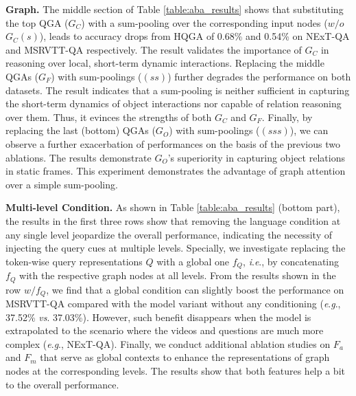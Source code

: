 \documentclass[letterpaper]{article} \usepackage{aaai21}  \usepackage{times}  \usepackage{helvet} \usepackage{courier}  \usepackage[hyphens]{url}  \usepackage{graphicx} \urlstyle{rm} \def\UrlFont{\rm}  \usepackage{natbib}  \usepackage{caption} \usepackage{color, colortbl}
\newcommand{\vs}{\textit{vs}. }
\newcommand{\ie}{\textit{i}.\textit{e}.}
\newcommand{\eg}{\textit{e}.\textit{g}.}
\begin{document}
\textbf{Graph.} The middle section of Table \ref{table:aba_results} shows that substituting the top QGA ($G_C$) with a sum-pooling over the corresponding input nodes ($w/o$ $G_C(s)$), leads to accuracy drops from HQGA of 0.68\% and 0.54\% on NExT-QA and MSRVTT-QA respectively. The result validates the importance of $G_C$ in reasoning over local, short-term dynamic interactions. Replacing the middle QGAs ($G_F$) with sum-poolings ($(ss)$) further degrades the performance on both datasets. 
The result indicates that a sum-pooling is neither sufficient in capturing the short-term dynamics of object interactions nor capable of relation reasoning over them. Thus, it evinces the strengths of both $G_C$ and $G_F$. Finally, by replacing the last (bottom) QGAs ($G_O$) with sum-poolings ($(sss)$), we can observe a further exacerbation of performances on the basis of the previous two ablations. The results demonstrate $G_O$'s superiority in capturing object relations in static frames. This experiment demonstrates the advantage of graph attention over a simple sum-pooling.

\textbf{Multi-level Condition.} 
As shown in Table \ref{table:aba_results} (bottom part), the results in the first three rows show that removing the language condition at any single level jeopardize the overall performance, indicating the necessity of injecting the query cues at multiple levels. Specially, we investigate replacing the token-wise query representations $Q$ with a global one $f_Q$, \ie, by concatenating $f_Q$ with the respective graph nodes at all levels. From the results shown in the row $w/f_Q$, we find that a global condition can slightly boost the performance on MSRVTT-QA compared with the model variant without any conditioning (\eg, 37.52\% \vs 37.03\%). However, such benefit disappears when the model is extrapolated to the scenario where the videos and questions are much more complex (\eg, NExT-QA). Finally, we conduct additional ablation studies on $F_a$ and $F_m$ that serve as global contexts to enhance the representations of graph nodes at the corresponding levels. The results show that both features help a bit to the overall performance.
\end{document}
